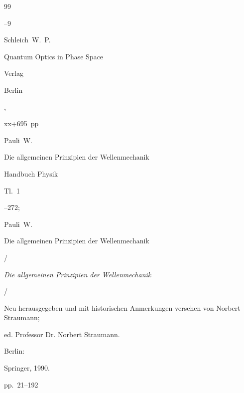 \begin{thebibliography}{99}



--9









\by  Schleich~W.~P.

\book Quantum Optics in Phase Space

\publ Verlag 

\publaddr Berlin

,


xx+695~pp







\by Pauli~W.

\paper Die allgemeinen Prinzipien der Wellenmechanik


\jour Handbuch Physik 


\volinfo Tl.~1


--272;


 Pauli~W.


Die allgemeinen Prinzipien der Wellenmechanik


/

{\it Die allgemeinen Prinzipien der Wellenmechanik}


/ 

Neu herausgegeben und mit historischen Anmerkungen versehen von Norbert Straumann;

ed. Professor Dr. Norbert Straumann.

Berlin:

Springer, 1990.

 pp.~21--192




\end{thebibliography}
